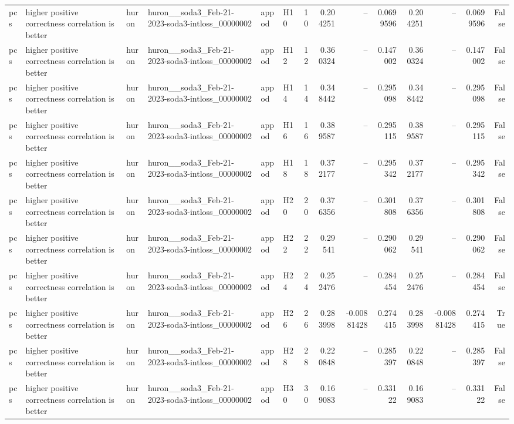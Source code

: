 \begin{longtable}{llllllrrrrrrrr}
pcs & higher positive correctness correlation is better & huron & huron\_\_soda3\_Feb-21-2023-soda3-intloss\_00000002 & appod & H10 & 10 & 0.204251 & -- & 0.0699596 & 0.204251 & -- & 0.0699596 & False \\
pcs & higher positive correctness correlation is better & huron & huron\_\_soda3\_Feb-21-2023-soda3-intloss\_00000002 & appod & H12 & 12 & 0.360324 & -- & 0.147002 & 0.360324 & -- & 0.147002 & False \\
pcs & higher positive correctness correlation is better & huron & huron\_\_soda3\_Feb-21-2023-soda3-intloss\_00000002 & appod & H14 & 14 & 0.348442 & -- & 0.295098 & 0.348442 & -- & 0.295098 & False \\
pcs & higher positive correctness correlation is better & huron & huron\_\_soda3\_Feb-21-2023-soda3-intloss\_00000002 & appod & H16 & 16 & 0.389587 & -- & 0.295115 & 0.389587 & -- & 0.295115 & False \\
pcs & higher positive correctness correlation is better & huron & huron\_\_soda3\_Feb-21-2023-soda3-intloss\_00000002 & appod & H18 & 18 & 0.372177 & -- & 0.295342 & 0.372177 & -- & 0.295342 & False \\
pcs & higher positive correctness correlation is better & huron & huron\_\_soda3\_Feb-21-2023-soda3-intloss\_00000002 & appod & H20 & 20 & 0.376356 & -- & 0.301808 & 0.376356 & -- & 0.301808 & False \\
pcs & higher positive correctness correlation is better & huron & huron\_\_soda3\_Feb-21-2023-soda3-intloss\_00000002 & appod & H22 & 22 & 0.29541 & -- & 0.290062 & 0.29541 & -- & 0.290062 & False \\
pcs & higher positive correctness correlation is better & huron & huron\_\_soda3\_Feb-21-2023-soda3-intloss\_00000002 & appod & H24 & 24 & 0.252476 & -- & 0.284454 & 0.252476 & -- & 0.284454 & False \\
pcs & higher positive correctness correlation is better & huron & huron\_\_soda3\_Feb-21-2023-soda3-intloss\_00000002 & appod & H26 & 26 & 0.283998 & -0.00881428 & 0.274415 & 0.283998 & -0.00881428 & 0.274415 & True \\
pcs & higher positive correctness correlation is better & huron & huron\_\_soda3\_Feb-21-2023-soda3-intloss\_00000002 & appod & H28 & 28 & 0.220848 & -- & 0.285397 & 0.220848 & -- & 0.285397 & False \\
pcs & higher positive correctness correlation is better & huron & huron\_\_soda3\_Feb-21-2023-soda3-intloss\_00000002 & appod & H30 & 30 & 0.169083 & -- & 0.33122 & 0.169083 & -- & 0.33122 & False \\

\end{longtable}
